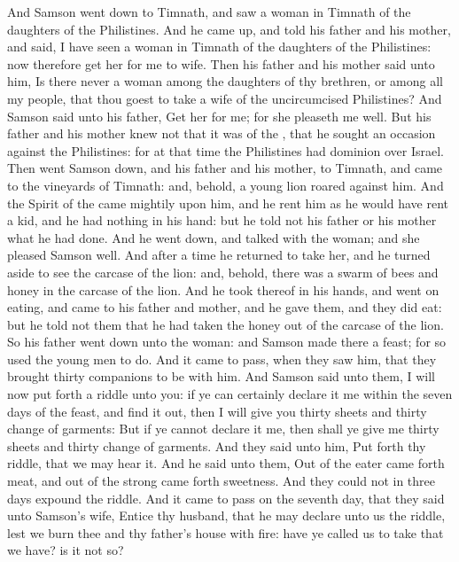 \begin{biblechapter} %
 And Samson went down to Timnath, and saw a woman in Timnath of the daughters of the Philistines.
\verse And he came up, and told his father and his mother, and said, I have seen a woman in Timnath of the daughters of the Philistines: now therefore get her for me to wife.
\verse Then his father and his mother said unto him, Is there never a woman among the daughters of thy brethren, or among all my people, that thou goest to take a wife of the uncircumcised Philistines? And Samson said unto his father, Get her for me; for she pleaseth me well.
\verse But his father and his mother knew not that it was of the \LORD, that he sought an occasion against the Philistines: for at that time the Philistines had dominion over Israel.
\verse Then went Samson down, and his father and his mother, to Timnath, and came to the vineyards of Timnath: and, behold, a young lion roared against him.
\verse And the Spirit of the \LORD came mightily upon him, and he rent him as he would have rent a kid, and he had nothing in his hand: but he told not his father or his mother what he had done.
\verse And he went down, and talked with the woman; and she pleased Samson well.
\verse And after a time he returned to take her, and he turned aside to see the carcase of the lion: and, behold, there was a swarm of bees and honey in the carcase of the lion.
\verse And he took thereof in his hands, and went on eating, and came to his father and mother, and he gave them, and they did eat: but he told not them that he had taken the honey out of the carcase of the lion.
\verse So his father went down unto the woman: and Samson made there a feast; for so used the young men to do.
\verse And it came to pass, when they saw him, that they brought thirty companions to be with him.
\verse And Samson said unto them, I will now put forth a riddle unto you: if ye can certainly declare it me within the seven days of the feast, and find it out, then I will give you thirty sheets and thirty change of garments:
\verse But if ye cannot declare it me, then shall ye give me thirty sheets and thirty change of garments. And they said unto him, Put forth thy riddle, that we may hear it.
\verse And he said unto them, Out of the eater came forth meat, and out of the strong came forth sweetness. And they could not in three days expound the riddle.
\verse And it came to pass on the seventh day, that they said unto Samson's wife, Entice thy husband, that he may declare unto us the riddle, lest we burn thee and thy father's house with fire: have ye called us to take that we have? is it not so?

\end{biblechapter}
